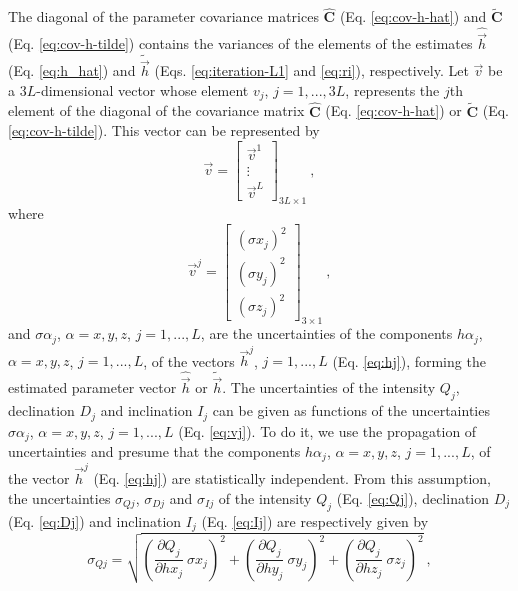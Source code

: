 \documentclass[journal abbreviation, npg]{copernicus}
\begin{document}
The diagonal of the parameter covariance matrices $\hat{\mathbf{C}}$ (Eq. \ref{eq:cov-h-hat}) and $\tilde{\mathbf{C}}$ (Eq. \ref{eq:cov-h-tilde}) contains the variances of the elements of the estimates $\hat{\vec{h}}$ (Eq. \ref{eq:h_hat}) and $\tilde{\vec{h}}$ (Eqs. \ref{eq:iteration-L1} and \ref{eq:ri}), respectively. Let $\vec{v}$ be a $3L$-dimensional vector whose element $v_{j}$, $j = 1, ..., 3L$, represents the $j$th element of the diagonal of the covariance matrix $\hat{\mathbf{C}}$ (Eq. \ref{eq:cov-h-hat}) or $\tilde{\mathbf{C}}$ (Eq. \ref{eq:cov-h-tilde}). This vector can be represented by
\begin{equation}
\vec{v} = 
\left[
\begin{array}{cc}
\vec{v}^{1} \\
\vdots \\
\vec{v}^{L}
\end{array}
\right]_{3L \times 1} \: ,
\label{eq:v}
\end{equation}
where
\begin{equation}
\vec{v}^{j} = 
\left[
\begin{array}{cc}
\left( \sigma x_{j} \right)^{2} \\
\left( \sigma y_{j} \right)^{2} \\
\left( \sigma z_{j} \right)^{2}
\end{array}
\right]_{3 \times 1} \: ,
\label{eq:vj}
\end{equation}
and ${\sigma \alpha}_{j}$, $\alpha = x, y, z$, $j = 1, ..., L$, are the uncertainties of the components ${h \alpha}_{j}$, $\alpha = x, y, z$, $j = 1, ..., L$, of the vectors $\vec{h}^{j}$, $j = 1, ..., L$ (Eq. \ref{eq:hj}), forming the estimated parameter vector $\hat{\vec{h}}$ or $\tilde{\vec{h}}$. The uncertainties of the intensity $Q_{j}$, declination $D_{j}$ and inclination $I_{j}$ can be given as functions of the uncertainties ${\sigma \alpha}_{j}$, $\alpha = x, y, z$, $j = 1, ..., L$ (Eq. \ref{eq:vj}). To do it, we use the propagation of uncertainties \citep{fornasini2008} and presume that the components ${h \alpha}_{j}$, $\alpha = x, y, z$, $j = 1, ..., L$, of the vector $\vec{h}^{j}$ (Eq. \ref{eq:hj}) are statistically independent. From this assumption, the uncertainties $\sigma_{Qj}$, $\sigma_{Dj}$ and $\sigma_{Ij}$ of the intensity $Q_{j}$ (Eq. \ref{eq:Qj}), declination $D_{j}$ (Eq. \ref{eq:Dj}) and inclination $I_{j}$ (Eq. \ref{eq:Ij}) are respectively given by
\begin{equation}
\sigma_{Qj} = \sqrt{\left( \frac{\partial Q_{j}}{\partial hx_{j}} \: \sigma x_{j} \right)^{2} +
                    \left( \frac{\partial Q_{j}}{\partial hy_{j}} \: \sigma y_{j} \right)^{2} +
                    \left( \frac{\partial Q_{j}}{\partial hz_{j}} \: \sigma z_{j} \right)^{2}} \: ,
\label{eq:sigmaQj}
\end{equation}
\end{document}
